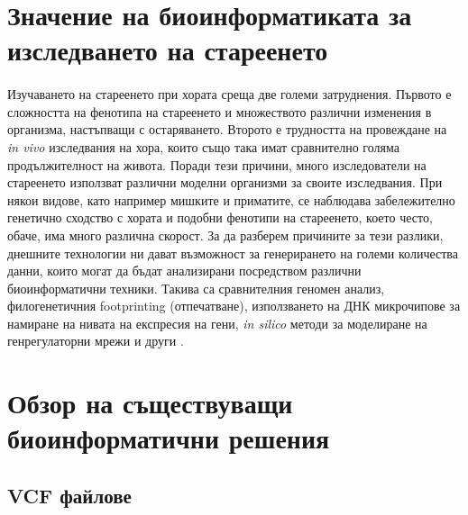 \documentclass[pdftex,cyrillic,14pt,a4page,twoside,openright]{extreport}
\begin{document}
\section[Значение на биоинформатиката за изследването на стареенето]{Значение на биоинформатиката за\\ изследването на стареенето}
\paragraph{}
Изучаването на стареенето при хората среща две големи затруднения. Първото е сложността на фенотипа на стареенето и множеството различни изменения в организма, настъпващи с остаряването. Второто е трудността на провеждане на \textit{in vivo} изследвания на хора, които също така имат сравнително голяма продължителност на живота. Поради тези причини, много изследователи на стареенето използват различни моделни организми за своите изследвания. При някои видове, като например мишките и приматите, се наблюдава забележително генетично сходство с хората и подобни фенотипи на стареенето, което често, обаче, има много различна скорост. За да разберем причините за тези разлики, днешните технологии ни дават възможност за генерирането на големи количества данни, които могат да бъдат анализирани посредством различни биоинформатични техники. Такива са сравнителния геномен анализ, филогенетичния footprinting (отпечатване), използването на ДНК микрочипове за намиране на нивата на експресия на гени, \textit{in silico} методи за моделиране на генрегулаторни мрежи и други \cite{demagalhaes2004}.
 
\paragraph{}
 
 
\section[Обзор на съществуващи биоинформатични решения]{Обзор на съществуващи\\ биоинформатични решения}
\subsection{VCF файлове}
\end{document}
